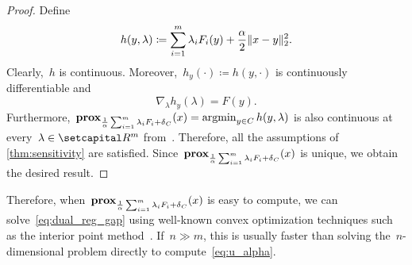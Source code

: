 \documentclass[../../main]{subfiles}
\begin{document}
\begin{proof}
    Define
    \[
        h(y, \lambda) \coloneqq \sum_{i = 1}^{m} \lambda_i F_i(y) + \frac{\alpha}{2} \lVert x - y\rVert_2^2
    .\] 
    Clearly,~$h$ is continuous.
    Moreover,~$h_y(\cdot) \coloneqq h(y, \cdot)$ is continuously differentiable and
    \[
        \nabla_\lambda h_y(\lambda) = F(y)
    .\] 
    Furthermore,~$\operatorname{\mathbf{prox}}_{\frac{1}{\alpha} \sum_{i = 1}^{m} \lambda_i F_i + \operatorname{\delta}_C}(x) = \operatorname*{argmin}_{y \in C} h(y, \lambda)$ is also continuous at every~$\lambda \in \setR^m$ from~\cite[Excercise 7.38]{Rockafellar1998}.
    Therefore, all the assumptions of \cref{thm:sensitivity} are satisfied.
    Since~$\operatorname{\mathbf{prox}}_{\frac{1}{\alpha} \sum_{i = 1}^{m} \lambda_i F_i + \operatorname{\delta}_C}(x)$ is unique, we obtain the desired result.
\end{proof}
Therefore, when~$\operatorname{\mathbf{prox}}_{\frac{1}{\alpha} \sum_{i = 1}^{m} \lambda_i F_i + \operatorname{\delta}_C}(x)$ is easy to compute, we can solve~\cref{eq:dual_reg_gap} using well-known convex optimization techniques such as the interior point method~\cite{Bertsekas1999}.
If~$n \gg m$, this is usually faster than solving the~$n$-dimensional problem directly to compute~\cref{eq:u_alpha}.
\end{document}
